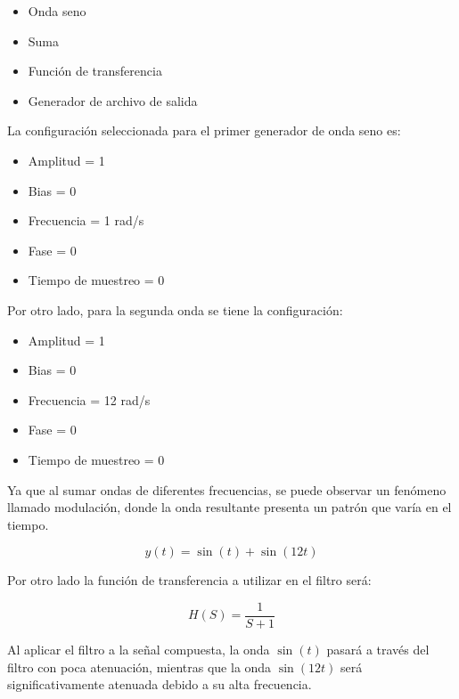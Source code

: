 \begin{itemize}
    \item Onda seno
    \item Suma
    \item Función de transferencia
    \item Generador de archivo de salida
\end{itemize}

La configuración seleccionada para el primer generador de onda seno es:

\begin{itemize}
    \item Amplitud = 1
    \item Bias = 0 
    \item Frecuencia = 1 rad/s
    \item Fase = 0 
    \item Tiempo de muestreo = 0 
\end{itemize}

Por otro lado, para la segunda onda se tiene la configuración:

\begin{itemize}
    \item Amplitud = 1
    \item Bias = 0 
    \item Frecuencia = 12 rad/s
    \item Fase = 0 
    \item Tiempo de muestreo = 0 
\end{itemize}

Ya que al sumar ondas de diferentes frecuencias, se puede observar un fenómeno llamado modulación, donde la onda resultante presenta un patrón que varía en el tiempo.

\begin{equation}
    y(t) = \sin(t) + \sin(12t)
    \label{eq:funcion_de_suma_de_ondas}
\end{equation}

Por otro lado la función de transferencia a utilizar en el filtro será:

\begin{equation}
    H(S) = \frac{1}{S+1}
    \label{eq:funcion_de_transferencia_filtro}
\end{equation}

Al aplicar el filtro a la señal compuesta,  la onda $\sin(t)$ pasará a través del filtro con poca atenuación, mientras que la onda $\sin(12t)$ será significativamente atenuada debido a su  alta frecuencia.

